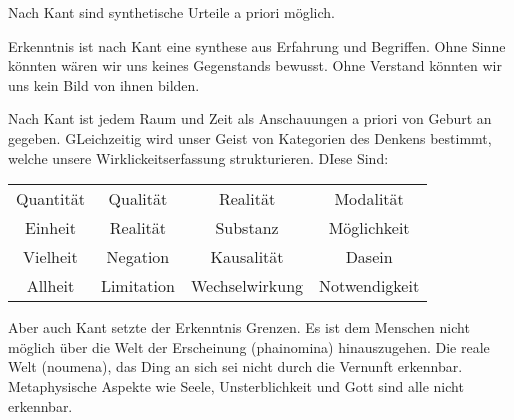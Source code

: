 \documentclass{article}
\begin{document}
Nach Kant sind synthetische Urteile a priori möglich.

Erkenntnis ist nach Kant eine synthese aus Erfahrung und Begriffen. Ohne Sinne könnten wären wir uns keines Gegenstands bewusst.
Ohne Verstand könnten wir uns kein Bild von ihnen bilden.

Nach Kant ist jedem Raum und Zeit als Anschauungen a priori von Geburt an gegeben. GLeichzeitig wird unser Geist von Kategorien des Denkens bestimmt,
welche unsere Wirklickeitserfassung strukturieren. DIese Sind:
\begin{center}
    \begin{tabular} {c c c c}
        Quantität & Qualität & Realität & Modalität \\
        Einheit & Realität & Substanz & Möglichkeit \\
        Vielheit & Negation & Kausalität & Dasein \\
        Allheit & Limitation & Wechselwirkung & Notwendigkeit
    \end{tabular}
\end{center}
Aber auch Kant setzte der Erkenntnis Grenzen. Es ist dem Menschen nicht möglich über die Welt der Erscheinung (phainomina) hinauszugehen.
Die reale Welt (noumena), das Ding an sich sei nicht durch die Vernunft erkennbar. Metaphysische Aspekte wie Seele, Unsterblichkeit und
Gott sind alle nicht erkennbar.
\end{document}
